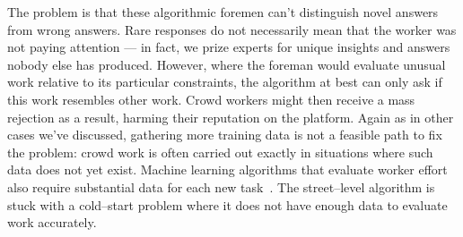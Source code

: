 \documentclass[main]{subfiles}
\begin{document}
The problem is that
these algorithmic foremen can't distinguish novel answers from wrong answers.
Rare responses do not necessarily mean that the worker was not paying attention
--- in fact, we prize experts for unique insights and answers nobody else has produced.
However, where the foreman would evaluate unusual work relative to its particular constraints,
the algorithm at best can only ask if this work resembles other work.
Crowd workers might then receive a mass rejection as a result,
harming their reputation on the platform.
Again as in other cases we've discussed, gathering more training data is not a feasible path to fix the problem:
crowd work is often carried out exactly in situations where such data does not yet exist.
Machine learning algorithms that evaluate worker effort also require
substantial data for each new task~\cite{rzeszotarski2011instrumenting}.
The street--level algorithm is stuck with a cold--start problem where
it does not have enough data to evaluate work accurately.

\onlyinsubfile{
  
  
}
\end{document}
